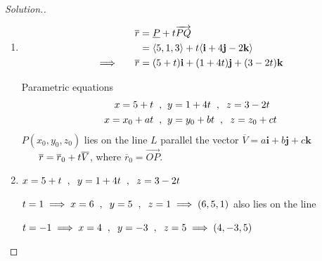 \documentclass[11pt,a4paper]{article}
\theoremstyle{definition}
\newenvironment{solution}
  {\renewcommand{\qedsymbol}{}\begin{proof}[\textit{Solution}.]}
  {\end{proof}}
\begin{document}
\begin{solution}
\begin{enumerate}
\item 
\begin{align*}
\overline{r} & = \underline{P} + t\overrightarrow{PQ}\\
& = \langle 5,1,3\rangle + t\langle \textbf{i} + 4\textbf{j} - 2\textbf{k}\rangle\\
\implies\hspace{0.5cm} \overline{r} & = (5 + t)\textbf{i} + (1 + 4t)\textbf{j} + (3 - 2t)\textbf{k}
\end{align*}

Parametric equations
\begin{align*}
x = 5 + t\hspace{0.2cm} , \hspace{0.2cm}& y = 1 + 4t\hspace{0.2cm},\hspace{0.2cm} z = 3-2t\\
x = x_0 + at\hspace{0.2cm} ,\hspace{0.2cm} & y = y_0 + bt\hspace{0.2cm},\hspace{0.2cm} z = z_0 + ct
\end{align*}
$P(x_0,y_0,z_0)$ lies on the line $L$ parallel the vector $\overline{V} = a\textbf{i} + b\textbf{j} + c\textbf{k}$ $\hspace{0.6cm} \overline{r} = \overline{r}_0 + t \overline{V}$, where $\overline{r}_0 = \overrightarrow{OP}$.

\item $x = 5 + t\hspace{0.2cm} , \hspace{0.2cm} y = 1 + 4t\hspace{0.2cm} , \hspace{0.2cm} z = 3 - 2t$

$t = 1 \implies x = 6\hspace{0.2cm} , \hspace{0.2cm} y = 5 \hspace{0.2cm} , \hspace{0.2cm} z = 1 \implies (6,5,1)$ also lies on the line

$t = -1 \implies x = 4\hspace{0.2cm} , \hspace{0.2cm} y = -3\hspace{0.2cm} , \hspace{0.2cm} z = 5 \implies (4,-3, 5)$
\end{enumerate}
\end{solution}
\end{document}
